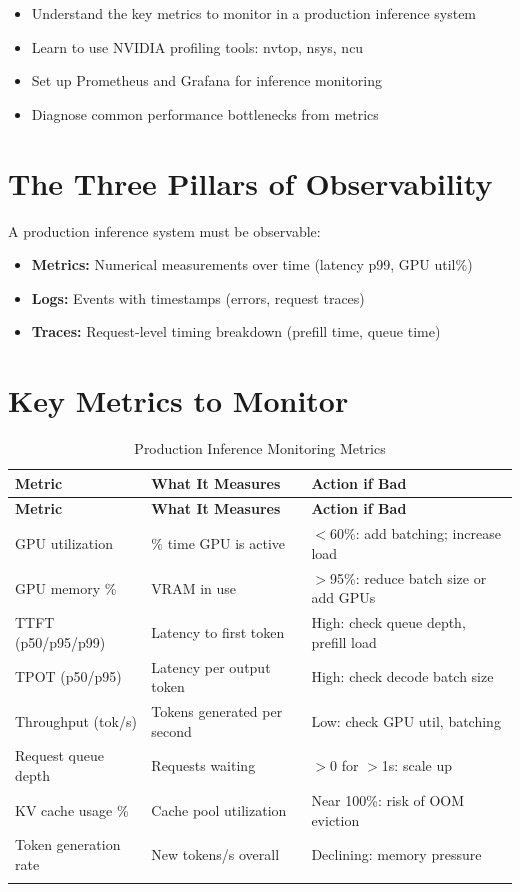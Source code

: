 \documentclass[11pt, twoside, openright]{book}
\newenvironment{learningobjectives}
  {\begin{tcolorbox}[enhanced, breakable,
    colback={rgb,255:red,232;green,240;blue,255},
    colframe=NavyBlue, boxrule=1.5pt, arc=4pt,
    title={\bfseries Learning Objectives},
    fonttitle=\bfseries\color{white},
    attach boxed title to top left={yshift=-2mm, xshift=5mm},
    boxed title style={colback=NavyBlue, arc=2pt}]
  \begin{itemize}[leftmargin=1.5em, itemsep=2pt]}
  {\end{itemize}\end{tcolorbox}}
\begin{document}
\begin{learningobjectives}
  \item Understand the key metrics to monitor in a production inference system
  \item Learn to use NVIDIA profiling tools: nvtop, nsys, ncu
  \item Set up Prometheus and Grafana for inference monitoring
  \item Diagnose common performance bottlenecks from metrics
\end{learningobjectives}

\section{The Three Pillars of Observability}

A production inference system must be observable:

\begin{itemize}
  \item \textbf{Metrics:} Numerical measurements over time (latency p99, GPU util\%)
  \item \textbf{Logs:} Events with timestamps (errors, request traces)
  \item \textbf{Traces:} Request-level timing breakdown (prefill time, queue time)
\end{itemize}

\section{Key Metrics to Monitor}

\begin{longtable}{@{}p{3.5cm}p{4cm}p{5cm}@{}}
  \toprule
  \textbf{Metric} & \textbf{What It Measures} & \textbf{Action if Bad} \\
  \midrule
  \endfirsthead
  \toprule
  \textbf{Metric} & \textbf{What It Measures} & \textbf{Action if Bad} \\
  \midrule
  \endhead
  GPU utilization & \% time GPU is active & $<$60\%: add batching; increase load \\
  GPU memory \% & VRAM in use & $>$95\%: reduce batch size or add GPUs \\
  TTFT (p50/p95/p99) & Latency to first token & High: check queue depth, prefill load \\
  TPOT (p50/p95) & Latency per output token & High: check decode batch size \\
  Throughput (tok/s) & Tokens generated per second & Low: check GPU util, batching \\
  Request queue depth & Requests waiting & $>$0 for $>$1s: scale up \\
  KV cache usage \% & Cache pool utilization & Near 100\%: risk of OOM eviction \\
  Token generation rate & New tokens/s overall & Declining: memory pressure \\
  \bottomrule
  \caption{Production Inference Monitoring Metrics}
\end{longtable}
\end{document}
